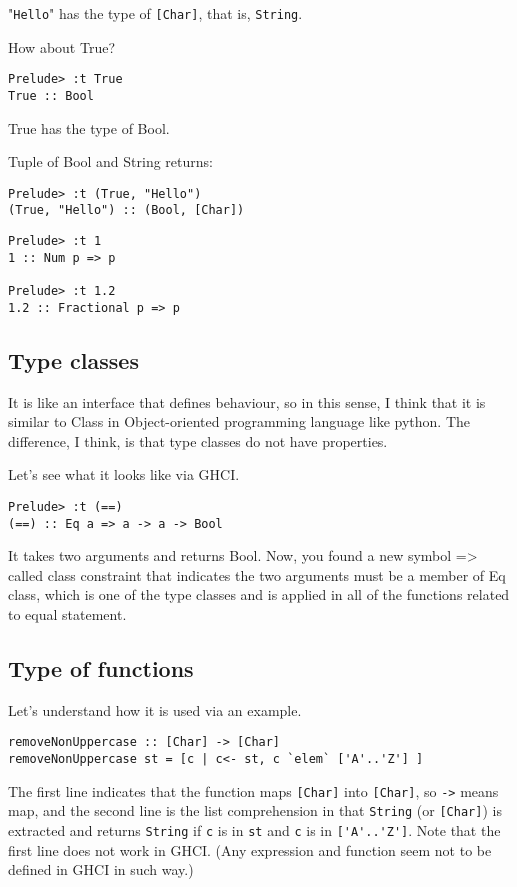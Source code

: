 "\lstinline{Hello}" has the type of \lstinline{[Char]}, that is, \lstinline{String}.

How about True?
\begin{lstlisting}
Prelude> :t True
True :: Bool
\end{lstlisting}
True has the type of Bool.

Tuple of Bool and String returns:
\begin{lstlisting}
Prelude> :t (True, "Hello")
(True, "Hello") :: (Bool, [Char])
\end{lstlisting}

\begin{lstlisting}
Prelude> :t 1
1 :: Num p => p

Prelude> :t 1.2
1.2 :: Fractional p => p
\end{lstlisting}

\subsection{Type classes}
It is like an interface that defines behaviour, so in this sense, I think that it is similar to Class in Object-oriented programming language like python. The difference, I think, is that type classes do not have properties. 

Let’s see what it looks like via GHCI.
\begin{lstlisting}
Prelude> :t (==)
(==) :: Eq a => a -> a -> Bool
\end{lstlisting}

It takes two arguments and returns Bool. Now, you found a new symbol => called class constraint that indicates the two arguments must be a member of Eq class, which is one of the type classes and is applied in all of the functions related to equal statement.

\subsection{Type of functions}
Let’s understand how it is used via an example.
\begin{lstlisting}
removeNonUppercase :: [Char] -> [Char]
removeNonUppercase st = [c | c<- st, c `elem` ['A'..'Z'] ]
\end{lstlisting}

The first line indicates that the function maps \lstinline{[Char]} into \lstinline{[Char]}, 
so \lstinline{->} means map, 
and the second line is the list comprehension in that \lstinline{String} (or \lstinline{[Char]}) is extracted and returns \lstinline{String} if \lstinline{c} is in \lstinline{st} and \lstinline{c} is in \lstinline{['A'..'Z']}. 
Note that the first line does not work in GHCI. 
(Any expression and function seem not to be defined in GHCI in such way.)

